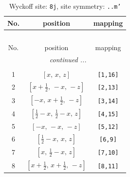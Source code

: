 \documentclass[fleqn,8pt]{jsarticle}
\begin{document}
\begin{longtable}{ccc}
\caption{Wyckoff site: {\tt 8j}, site symmetry: {\tt ..m'}}
 \\
 \hline \hline
No. & position & mapping \\ \hline \endfirsthead

\multicolumn{2}{l}{\tablename\ \thetable{}} \\
 \hline \hline
No. & position & mapping \\ \hline \endhead

 \hline \hline
\multicolumn{2}{r}{\footnotesize\it continued ...} \\ \endfoot

 \hline \hline
\multicolumn{2}{r}{} \\ \endlastfoot

1 & $\left[ x,\, x,\, z \right]$ & {\tt [1,16]} \\ \hline
2 & $\left[ x + \frac{1}{2},\, - x,\, - z \right]$ & {\tt [2,13]} \\ \hline
3 & $\left[ - x,\, x + \frac{1}{2},\, - z \right]$ & {\tt [3,14]} \\ \hline
4 & $\left[ \frac{1}{2} - x,\, \frac{1}{2} - x,\, z \right]$ & {\tt [4,15]} \\ \hline
5 & $\left[ - x,\, - x,\, - z \right]$ & {\tt [5,12]} \\ \hline
6 & $\left[ \frac{1}{2} - x,\, x,\, z \right]$ & {\tt [6,9]} \\ \hline
7 & $\left[ x,\, \frac{1}{2} - x,\, z \right]$ & {\tt [7,10]} \\ \hline
8 & $\left[ x + \frac{1}{2},\, x + \frac{1}{2},\, - z \right]$ & {\tt [8,11]} \\
\end{longtable}
\renewcommand{\arraystretch}{1.2}
\end{document}

